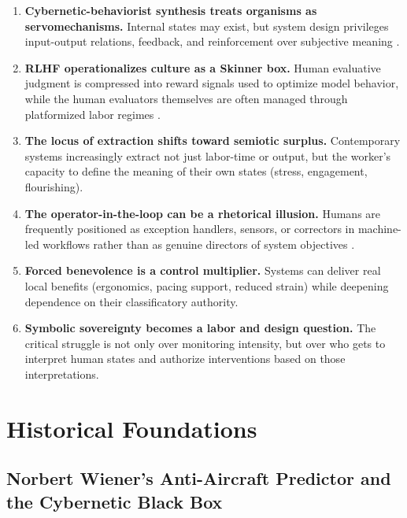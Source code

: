 \documentclass[11pt, a4paper]{article}
\begin{document}
\begin{enumerate}[leftmargin=1.5em]
    \item \textbf{Cybernetic-behaviorist synthesis treats organisms as servomechanisms.} Internal states may exist, but system design privileges input-output relations, feedback, and reinforcement over subjective meaning \cite{wiener1948cybernetics,skinner1953science}.

    \item \textbf{RLHF operationalizes culture as a Skinner box.} Human evaluative judgment is compressed into reward signals used to optimize model behavior, while the human evaluators themselves are often managed through platformized labor regimes \cite{christiano2017preferences,ouyang2022training,sutton2018reinforcement,gray2019ghost}.

    \item \textbf{The locus of extraction shifts toward semiotic surplus.} Contemporary systems increasingly extract not just labor-time or output, but the worker's capacity to define the meaning of their own states (stress, engagement, flourishing).

    \item \textbf{The operator-in-the-loop can be a rhetorical illusion.} Humans are frequently positioned as exception handlers, sensors, or correctors in machine-led workflows rather than as genuine directors of system objectives \cite{kellogg2020algorithms}.

    \item \textbf{Forced benevolence is a control multiplier.} Systems can deliver real local benefits (ergonomics, pacing support, reduced strain) while deepening dependence on their classificatory authority.

    \item \textbf{Symbolic sovereignty becomes a labor and design question.} The critical struggle is not only over monitoring intensity, but over who gets to interpret human states and authorize interventions based on those interpretations.
\end{enumerate}

\section{Historical Foundations}

\subsection{Norbert Wiener's Anti-Aircraft Predictor and the Cybernetic Black Box}
\end{document}
